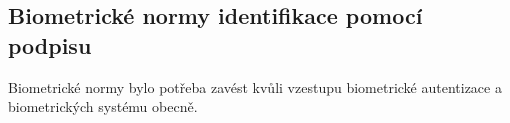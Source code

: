 

\subsection{Biometrické normy identifikace pomocí podpisu}
Biometrické normy bylo potřeba zavést kvůli vzestupu biometrické autentizace a biometrických systému obecně.


